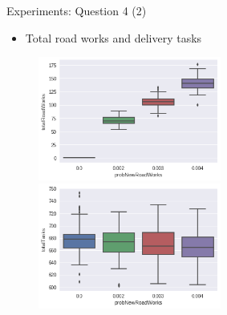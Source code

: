 \begin{frame}{Experiments: Question 4 (2)}
    \begin{itemize}
        \item Total road works and delivery tasks
    \end{itemize}

    \begin{figure}[!hbt]
        \begin{adjustbox}{center}
            \includegraphics[width=6cm]{img/question4-plot1}
            \includegraphics[width=6cm]{img/question4-plot2}
        \end{adjustbox}
    \end{figure}
\end{frame}

